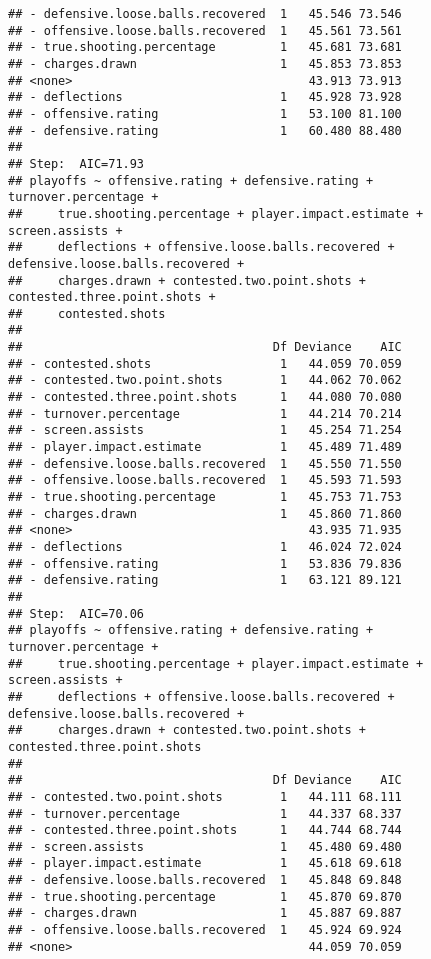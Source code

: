 \documentclass[
]{article}
\begin{document}
\begin{verbatim}
## - defensive.loose.balls.recovered  1   45.546 73.546
## - offensive.loose.balls.recovered  1   45.561 73.561
## - true.shooting.percentage         1   45.681 73.681
## - charges.drawn                    1   45.853 73.853
## <none>                                 43.913 73.913
## - deflections                      1   45.928 73.928
## - offensive.rating                 1   53.100 81.100
## - defensive.rating                 1   60.480 88.480
## 
## Step:  AIC=71.93
## playoffs ~ offensive.rating + defensive.rating + turnover.percentage + 
##     true.shooting.percentage + player.impact.estimate + screen.assists + 
##     deflections + offensive.loose.balls.recovered + defensive.loose.balls.recovered + 
##     charges.drawn + contested.two.point.shots + contested.three.point.shots + 
##     contested.shots
## 
##                                   Df Deviance    AIC
## - contested.shots                  1   44.059 70.059
## - contested.two.point.shots        1   44.062 70.062
## - contested.three.point.shots      1   44.080 70.080
## - turnover.percentage              1   44.214 70.214
## - screen.assists                   1   45.254 71.254
## - player.impact.estimate           1   45.489 71.489
## - defensive.loose.balls.recovered  1   45.550 71.550
## - offensive.loose.balls.recovered  1   45.593 71.593
## - true.shooting.percentage         1   45.753 71.753
## - charges.drawn                    1   45.860 71.860
## <none>                                 43.935 71.935
## - deflections                      1   46.024 72.024
## - offensive.rating                 1   53.836 79.836
## - defensive.rating                 1   63.121 89.121
## 
## Step:  AIC=70.06
## playoffs ~ offensive.rating + defensive.rating + turnover.percentage + 
##     true.shooting.percentage + player.impact.estimate + screen.assists + 
##     deflections + offensive.loose.balls.recovered + defensive.loose.balls.recovered + 
##     charges.drawn + contested.two.point.shots + contested.three.point.shots
## 
##                                   Df Deviance    AIC
## - contested.two.point.shots        1   44.111 68.111
## - turnover.percentage              1   44.337 68.337
## - contested.three.point.shots      1   44.744 68.744
## - screen.assists                   1   45.480 69.480
## - player.impact.estimate           1   45.618 69.618
## - defensive.loose.balls.recovered  1   45.848 69.848
## - true.shooting.percentage         1   45.870 69.870
## - charges.drawn                    1   45.887 69.887
## - offensive.loose.balls.recovered  1   45.924 69.924
## <none>                                 44.059 70.059

\end{verbatim}
\end{document}
